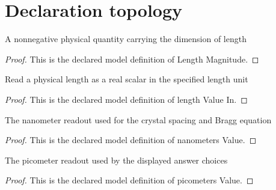 \section{Declaration topology}
\begin{definition}
  \label{def:physics:phyx-mini-0081:phyxminiproblems-problemphyxmini0081-lengthmagnitude}
  A nonnegative physical quantity carrying the dimension of length
\end{definition}
\begin{proof}
  This is the declared model definition of Length Magnitude.
\end{proof}
\begin{definition}
  \label{def:physics:phyx-mini-0081:phyxminiproblems-problemphyxmini0081-lengthvaluein}
  Read a physical length as a real scalar in the specified length unit
\end{definition}
\begin{proof}
  This is the declared model definition of length Value In.
\end{proof}
\begin{definition}
  \label{def:physics:phyx-mini-0081:phyxminiproblems-problemphyxmini0081-nanometersvalue}
  The nanometer readout used for the crystal spacing and Bragg equation
\end{definition}
\begin{proof}
  This is the declared model definition of nanometers Value.
\end{proof}
\begin{definition}
  \label{def:physics:phyx-mini-0081:phyxminiproblems-problemphyxmini0081-picometersvalue}
  The picometer readout used by the displayed answer choices
\end{definition}
\begin{proof}
  This is the declared model definition of picometers Value.
\end{proof}
